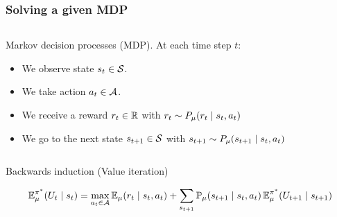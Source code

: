 \documentclass[9pt]{beamer}
\begin{document}
\begin{frame}
\frametitle{Solving a given MDP}
  \begin{columns}
    \begin{column}{0.49\textwidth}
      \begin{block}{Markov decision processes (MDP).}
        At each time
        step $t$:
        \begin{itemize}
        \item We observe \alert{state} $s_t \in {\mathcal{S}}$.
        \item We take \alert{action} $a_t \in {\mathcal{A}}$.
        \item We receive a \alert{reward} $r_t \in {\mathbb{R}}$ with $r_t \sim P_\mu(r_t \mid s_t, a_t)$
        \item We go to the \alert{next} state $s_{t+1} \in {\mathcal{S}}$ with $s_{t+1} \sim P_\mu(s_{t+1} \mid s_t, a_t)$
        \end{itemize}
      \end{block}
    \end{column}
    \begin{column}{0.49\textwidth}
      \begin{center}
      \end{center}
    \end{column}
  \end{columns}
  \begin{exampleblock}{Backwards induction (Value iteration)}
    \begin{algorithmic}
      \State 
      \[
        \mathop{\mbox{\ensuremath{\mathbb{E}}}}\nolimits^{\pi^*}_\mu(U_t \mid s_t) = \max_{a_t \in {\mathcal{A}}} \mathop{\mbox{\ensuremath{\mathbb{E}}}}\nolimits_\mu(r_t \mid s_t, a_t) + \sum_{{s_{t+1}}} \mathop{\mbox{\ensuremath{\mathbb{P}}}}\nolimits_\mu(s_{t+1} \mid s_t, a_t) \mathop{\mbox{\ensuremath{\mathbb{E}}}}\nolimits^{\pi^*}_\mu(U_{t+1} \mid s_{t+1})
      \]
      \EndFor
    \end{algorithmic}
  \end{exampleblock}
\end{frame}
\end{document}
